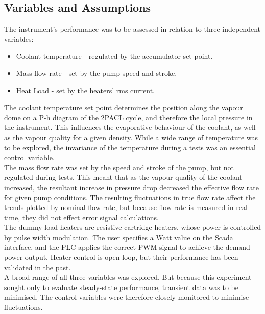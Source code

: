 \documentclass{report}
\begin{document}
\subsection{Variables and Assumptions}
The instrument's performance was to be assessed in relation to three independent variables:
\begin{itemize}
\item{Coolant temperature - regulated by the accumulator set point.}
\item{Mass flow rate - set by the pump speed and stroke.} 
\item{Heat Load - set by the heaters' rms current.}
\end{itemize}
The coolant temperature set point determines the position along the vapour dome on a P-h diagram of the 2PACL cycle, and therefore the local pressure in the instrument. This influences the evaporative behaviour of the coolant, as well as the vapour quality for a given density. While a wide range of temperature was to be explored, the invariance of the temperature during a tests was an essential control variable. \\
The mass flow rate was set by the speed and stroke of the pump, but not regulated during tests. This meant that as the vapour quality of the coolant increased, the resultant increase in pressure drop decreased the effective flow rate for given pump conditions. The resulting fluctuations in true flow rate affect the trends plotted by nominal flow rate, but because flow rate is measured in real time, they did not effect error signal calculations.\\
The dummy load heaters are resistive cartridge heaters, whose power is controlled by pulse width modulation. The user specifies a Watt value on the Scada interface, and the PLC applies the correct PWM signal to achieve the demand power output. Heater control is open-loop, but their performance has been validated in the past. %
\\
A broad range of all three variables was explored. But because this experiment sought only to evaluate steady-state performance, transient data was to be minimised. The control variables were therefore closely monitored to minimise fluctuations. 
\end{document}
